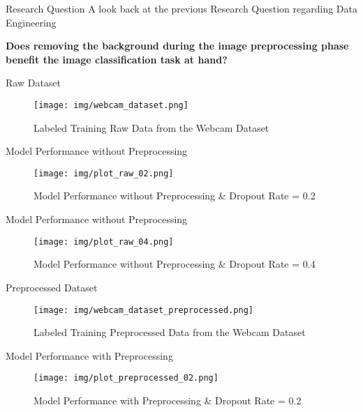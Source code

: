 \documentclass[aspectratio=169]{beamer}
\newcommand{\pop}[1]{{\color{niceorange}\textbf{#1}}}
\begin{document}
{    \begin{frame}{Research Question}
        A look back at the previous Research Question regarding Data Engineering
        
        \pop{Does removing the background during the image preprocessing phase benefit the image classification task at hand?}
    \end{frame}
    
    \begin{frame}{Raw Dataset}
        \begin{figure}
            \centering
            \texttt{[image: img/webcam\_dataset.png]}
            \caption{Labeled Training Raw Data from the Webcam Dataset}
        \end{figure}    
    \end{frame}

    \begin{frame}{Model Performance without Preprocessing}
        \begin{figure}
            \centering
            \texttt{[image: img/plot\_raw\_02.png]}
            \caption{Model Performance without Preprocessing \& Dropout Rate = 0.2}
        \end{figure}    
    \end{frame}   

    \begin{frame}{Model Performance without Preprocessing}
        \begin{figure}
            \centering
            \texttt{[image: img/plot\_raw\_04.png]}
            \caption{Model Performance without Preprocessing \& Dropout Rate = 0.4}
        \end{figure}    
    \end{frame}
    
    \begin{frame}{Preprocessed Dataset}
        \begin{figure}
            \centering
            \texttt{[image: img/webcam\_dataset\_preprocessed.png]}
            \caption{Labeled Training Preprocessed Data from the Webcam Dataset}
        \end{figure}    
    \end{frame}

    \begin{frame}{Model Performance with Preprocessing}
        \begin{figure}
            \centering
            \texttt{[image: img/plot\_preprocessed\_02.png]}
            \caption{Model Performance with Preprocessing \& Dropout Rate = 0.2}
        \end{figure}    
    \end{frame}   

}
\end{document}

